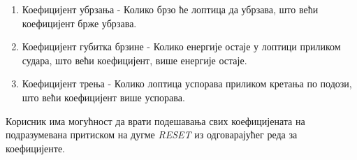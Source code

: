 \begin{enumerate}
\item Коефицијент убрзања - Колико брзо ће лоптица да убрзава, што већи коефицијент брже убрзава.
\item Коефицијент губитка брзине - Колико енергије остаје у лоптици приликом судара, што већи коефицијент, више енергије остаје.
\item Коефицијент трења - Колико лоптица успорава приликом кретања по подози, што већи коефицијент више успорава.
\end{enumerate}
Корисник има могућност да врати подешавања свих коефицијената на подразумевана притиском на дугме \emph{RESET} из одговарајућег реда за коефицијенте. 



